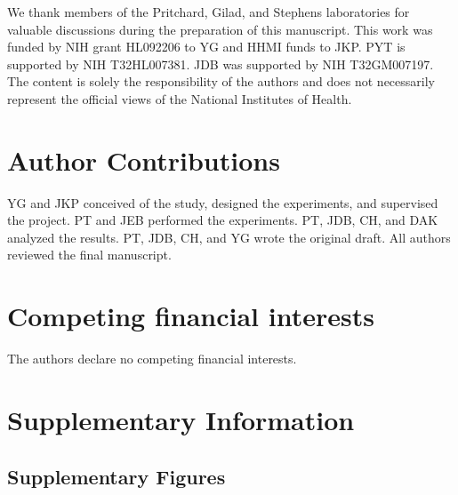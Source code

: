 We thank members of the Pritchard, Gilad, and Stephens laboratories for
valuable discussions during the preparation of this manuscript. This
work was funded by NIH grant HL092206 to YG and HHMI funds to JKP. PYT
is supported by NIH T32HL007381. JDB was supported by NIH T32GM007197.
The content is solely the responsibility of the authors and does not
necessarily represent the official views of the National Institutes of
Health.

\section{Author Contributions}\label{author-contributions}

YG and JKP conceived of the study, designed the experiments, and
supervised the project. PT and JEB performed the experiments. PT, JDB,
CH, and DAK analyzed the results. PT, JDB, CH, and YG wrote the original
draft. All authors reviewed the final manuscript.

\section{Competing financial
interests}\label{competing-financial-interests}

The authors declare no competing financial interests.

\clearpage
\section{Supplementary Information}\label{supplementary-information}

\subsection{Supplementary Figures}\label{supplementary-figures}

